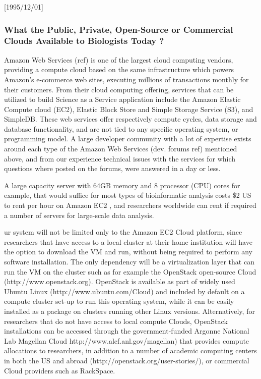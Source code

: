 \NeedsTeXFormat{LaTeX2e}[1995/12/01] \documentclass[10pt]{bmc_article}
\newenvironment{bmcformat}{\begin{raggedright}\baselineskip20pt\sloppy\setboolean{publ}{false}}{\end{raggedright}\baselineskip20pt\sloppy}
\begin{document}
\begin{bmcformat}
\subsubsection*{What the Public, Private, Open-Source or Commercial Clouds Available to Biologists Today ?} 

Amazon Web Services (ref) is one of the largest cloud computing vendors, providing a compute cloud  based on the same infrastructure which powers Amazon's e-commerce web sites, executing millions of transactions monthly for their customers. From their cloud computing offering, services that can be utilized to build Science as a Service application include the Amazon Elastic Compute cloud (EC2),  Elastic Block Store and Simple Storage Service (S3), and SimpleDB. These web services offer respectively compute cycles, data storage and database functionality, and are not tied to any specific operating system, or programming model. A large developer community with a lot of expertise exists around each type of the Amazon Web Services (dev. forums ref) mentioned above, and from our experience technical issues with the services for which questions where posted on the forums, were answered in a day or less.

A large capacity server with 64GB memory and 8 processor 
(CPU) cores for example, that would suffice for most types of bioinformatic analysis costs \$2 US to rent per hour 
on Amazon EC2 \cite{ec2price}, and researchers worldwide can rent if required a number of servers for large-scale 
data analysis. 

ur system will not be limited only to the Amazon EC2 Cloud platform, since researchers that have access to a
local cluster at their home institution will have the option to download the VM and run, without being
required to perform any software installation.  The only dependency will be a virtualization layer that can
run the VM on the cluster such as for example the OpenStack open-source Cloud (http://www.openstack.org).
OpenStack is available as part of widely used Ubuntu Linux (http://www.ubuntu.com/Cloud) and included by
default on a compute cluster set-up to run this operating system, while it can be easily installed as a
package on clusters running other Linux versions. Alternatively, for researchers that do not have access to
local compute Clouds, OpenStack installations can be accessed through the government-funded Argonne National
Lab Magellan Cloud http://www.alcf.anl.gov/magellan) that provides compute allocations to researchers, in
addition to a number of academic computing centers in both the US and abroad
(http://openstack.org/user-stories/), or commercial Cloud providers such as RackSpace.


\end{bmcformat}
\end{document}
